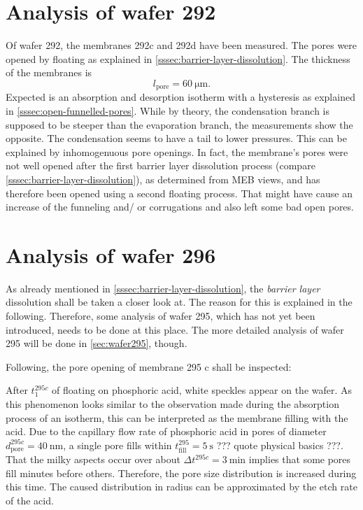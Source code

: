 \documentclass[thesis.tex]{subfiles}
\begin{document}
    \section{Analysis of wafer 292}
    \label{sec:wafer292}

        Of wafer 292, the membranes 292c and 292d have been measured. The pores were opened by floating as explained in \cref{sssec:barrier-layer-dissolution}. The thickness of the membranes is
        \begin{equation}
            l_\mathrm{pore}=\SI{60}{\micro\meter}.
        \end{equation}
        Expected is an absorption and desorption isotherm with a hysteresis as explained in \cref{sssec:open-funnelled-pores}.
        While by theory, the condensation branch is supposed to be steeper than the evaporation branch, the measurements show the opposite.
        The condensation seems to have a tail to lower pressures. This can be explained by inhomogenuous pore openings. In fact, the membrane's
        pores were not well opened after the first barrier layer dissolution process (compare \cref{sssec:barrier-layer-dissolution}), as determined
        from MEB views, and has therefore been opened using a second floating process. That might have cause an increase of the funneling and/ or
        corrugations and also left some bad open pores.


    \section{Analysis of wafer 296}
    \label{sec:wafer296}

      As already mentioned in \cref{sssec:barrier-layer-dissolution}, the \textit{barrier layer} dissolution shall be taken a closer look at. The reason for this is explained in the following. Therefore, some analysis of wafer 295, which has not yet been introduced, needs to be done at this place. The more detailed analysis of wafer 295 will be done in \cref{sec:wafer295}, though.
      \medskip

      Following, the pore opening of membrane 295 c shall be inspected:

      After $t_1^{295c}$ of floating on phosphoric acid, white speckles appear on the wafer. As this phenomenon looks similar to the observation made during the absorption process of an isotherm, this can be interpreted as the membrane filling with the acid. Due to the capillary flow rate of phosphoric acid in pores of diameter $d_\mathrm{pore}^{295c}=\SI{40}{\nano\meter}$, a single pore fills within $t_\mathrm{fill}^{295}=\SI{5}{\second}$ ??? quote physical basics ???. That the milky aspects occur over about $\Delta t^{295c} = \SI{3}{\minute}$ implies that some pores fill minutes before others. Therefore, the pore size distribution is increased during this time. The caused distribution in radius can be approximated by the etch rate of the acid.
\end{document}

